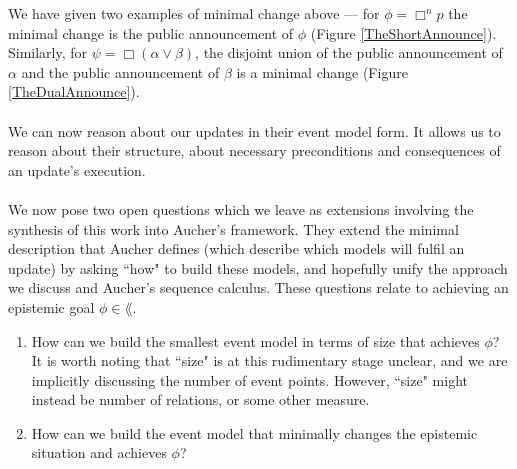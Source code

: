 We have given two examples of minimal change above --- for $\phi = \Box^n p$ the minimal change is
the public announcement of $\phi$ (Figure \ref{TheShortAnnounce}).
Similarly, for $\psi = \Box(\alpha \lor \beta)$, the disjoint union of the public announcement of
$\alpha$ and the public announcement of $\beta$ is a minimal change (Figure \ref{TheDualAnnounce}).\\
\\
We can now reason about our updates in their event model form.
It allows us to reason about their structure, about necessary preconditions and consequences of an
update's execution.\\
\\
We now pose two open questions which we leave as extensions involving the synthesis of this work
into Aucher's framework.
They extend the minimal description that Aucher defines (which describe which models will fulfil an
update) by asking ``how" to build these models, and hopefully unify the approach we discuss and
Aucher's sequence calculus.
These questions relate to achieving an epistemic goal $\phi \in \lang$.
\begin{enumerate}
	\item How can we build the smallest event model in terms of size that achieves $\phi$?
		It is worth noting that ``size" is at this rudimentary stage unclear, and we are implicitly discussing the
		number of event points.
		However, ``size" might instead be number of relations, or some other measure.
	\item How can we build the event model that minimally changes the epistemic situation and achieves
		$\phi$?
\end{enumerate}
